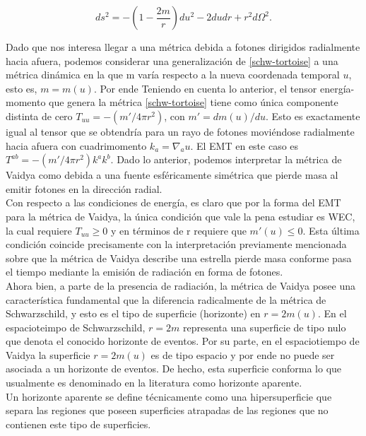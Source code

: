 \documentclass{article}
\numberwithin{equation}{section}
\theoremstyle{definition}
\begin{document}
\begin{equation}
\label{schw-tortoise}
ds^2 = - \left(1- \frac{2m}{r}\right)du^2 - 2dudr + r^2d\Omega^2.
\end{equation}

Dado que nos interesa llegar a una métrica debida a fotones dirigidos radialmente hacia afuera, podemos considerar una generalización de \eqref{schw-tortoise} a una métrica dinámica en la que m varía respecto a la nueva coordenada temporal $u$, esto es, $m = m(u)$. Por ende Teniendo en cuenta lo anterior, el tensor energía-momento que genera la métrica \eqref{schw-tortoise} tiene como única componente distinta de cero $T_{uu} = -(m'/4 \pi r^2)$, con $m' = dm(u)/du$. Esto es exactamente igual al tensor que se obtendría para un rayo de fotones moviéndose radialmente hacia afuera con cuadrimomento $k_{a} = \nabla_{a}u$. El EMT en este caso es $T^{ab} = -(m'/4 \pi r^2)k^{a}k^{b}$. Dado lo anterior, podemos interpretar la métrica de Vaidya como debida a una fuente esféricamente simétrica que pierde masa al emitir fotones en la dirección radial.\\

Con respecto a las condiciones de energía, es claro que por la forma del EMT para la métrica de Vaidya, la única condición que vale la pena estudiar es WEC, la cual requiere $T_{uu} \geq 0$ y en términos de r requiere que $m'(u)\leq 0 $. Esta última condición coincide precisamente con la interpretación previamente mencionada sobre que la métrica de Vaidya describe una estrella pierde masa conforme pasa el tiempo mediante la emisión de radiación en forma de fotones.\\

Ahora bien, a parte de la presencia de radiación, la métrica de Vaidya posee una característica fundamental que la diferencia radicalmente de la métrica de Schwarzschild, y esto es el tipo de superficie (horizonte) en $r = 2m(u)$. En el espacioteimpo de Schwarzschild, $r = 2m$ representa una superficie de tipo nulo que denota el conocido horizonte de eventos. Por su parte, en el espaciotiempo de Vaidya la superficie $r = 2m(u)$ es de tipo espacio y por ende no puede ser asociada a un horizonte de eventos. De hecho, esta superficie conforma lo que usualmente es denominado en la literatura \cite{blau,griffiths2009,wald2010} como horizonte aparente.\\

Un horizonte aparente se define técnicamente como una hipersuperficie que separa las regiones que poseen superficies atrapadas de las regiones que no contienen este tipo de superficies.\\
\end{document}
